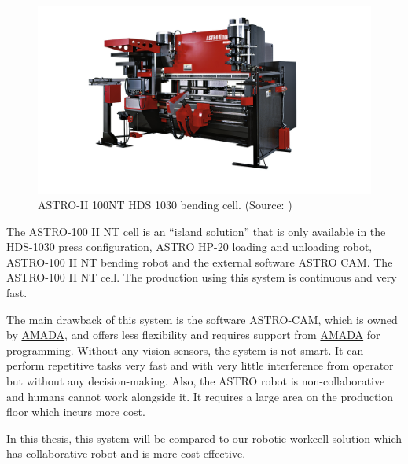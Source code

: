 \begin{figure}[h]
    \centering
    \includegraphics[width=\textwidth]{figures/ASTRO-100.jpg}
    \caption{ASTRO-II 100NT HDS 1030 bending cell. (Source: \cite{astro100})}
    \label{fig:astro}
\end{figure}

The ASTRO-100 II NT cell is an “island solution” that is only available in the HDS-1030 press configuration, ASTRO HP-20 loading and unloading robot, ASTRO-100 II NT bending robot and the external software ASTRO CAM.
The ASTRO-100 II NT cell. \cite{astro100} The production using this system is continuous and very fast.


The main drawback of this system is the software ASTRO-CAM, which is owned by \hyperref[acro:AMADA]{AMADA}, and offers less flexibility and requires support from \hyperref[acro:AMADA]{AMADA} for programming. Without any vision sensors, the system is not smart. It can perform repetitive tasks very fast and with very little interference from operator but without any decision-making. Also, the ASTRO robot is non-collaborative and humans cannot work alongside it.
It requires a large area on the production floor which incurs more cost.

In this thesis, this system will be compared to our robotic workcell solution which has collaborative robot and is more cost-effective.
